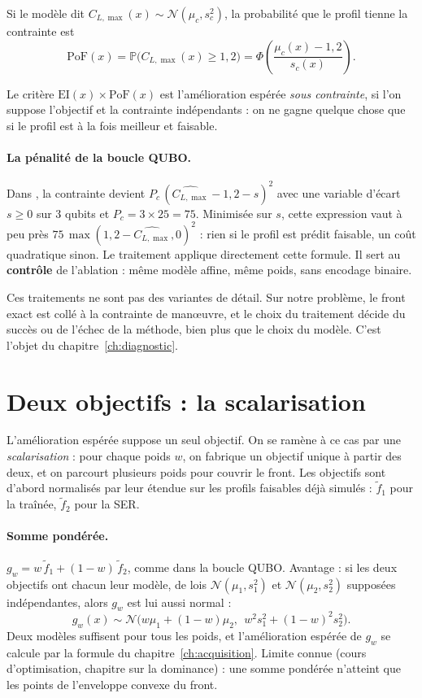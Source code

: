 \begin{definition}
Si le modèle dit $C_{L,\max}(x)\sim\mathcal N(\mu_c,s_c^2)$, la probabilité que le profil tienne la contrainte est
\[
\mathrm{PoF}(x)=\mathbb P\big(C_{L,\max}(x)\ge1{,}2\big)=\Phi\!\left(\frac{\mu_c(x)-1{,}2}{s_c(x)}\right).
\]
\end{definition}

Le critère $\mathrm{EI}(x)\times\mathrm{PoF}(x)$ est l'amélioration espérée \emph{sous contrainte}, si l'on suppose l'objectif et la contrainte indépendants : on ne gagne quelque chose que si le profil est à la fois meilleur et faisable.

\paragraph{La pénalité de la boucle QUBO.} Dans , la contrainte devient $P_c\,(\widehat{C_{L,\max}}-1{,}2-s)^2$ avec une variable d'écart $s\ge0$ sur 3 qubits et $P_c=3\times25=75$. Minimisée sur $s$, cette expression vaut à peu près $75\,\max(1{,}2-\widehat{C_{L,\max}},0)^2$ : rien si le profil est prédit faisable, un coût quadratique sinon. Le traitement  applique directement cette formule. Il sert au \textbf{contrôle} de l'ablation : même modèle affine, même poids, sans encodage binaire.

\begin{piege}
Ces traitements ne sont pas des variantes de détail. Sur notre problème, le front exact est collé à la contrainte de manœuvre, et le choix du traitement décide du succès ou de l'échec de la méthode, bien plus que le choix du modèle. C'est l'objet du chapitre~\ref{ch:diagnostic}.
\end{piege}

\section{Deux objectifs : la scalarisation}
L'amélioration espérée suppose un seul objectif. On se ramène à ce cas par une \emph{scalarisation} : pour chaque poids $w$, on fabrique un objectif unique à partir des deux, et on parcourt plusieurs poids pour couvrir le front. Les objectifs sont d'abord normalisés par leur étendue sur les profils faisables déjà simulés : $\tilde f_1$ pour la traînée, $\tilde f_2$ pour la SER.

\paragraph{Somme pondérée.} $g_w=w\,\tilde f_1+(1-w)\,\tilde f_2$, comme dans la boucle QUBO. Avantage : si les deux objectifs ont chacun leur modèle, de lois $\mathcal N(\mu_1,s_1^2)$ et $\mathcal N(\mu_2,s_2^2)$ supposées indépendantes, alors $g_w$ est lui aussi normal :
\[
g_w(x)\sim\mathcal N\Big(w\mu_1+(1-w)\mu_2,\ \ w^2s_1^2+(1-w)^2s_2^2\Big).
\]
Deux modèles suffisent pour tous les poids, et l'amélioration espérée de $g_w$ se calcule par la formule du chapitre~\ref{ch:acquisition}. Limite connue (cours d'optimisation, chapitre sur la dominance) : une somme pondérée n'atteint que les points de l'enveloppe convexe du front.

